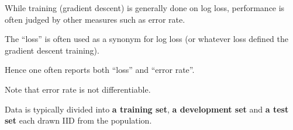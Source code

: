 {

While training (gradient descent) is generally done on log loss, performance is often judged by other measures such as error rate.

\vfill
The ``loss'' is often used as a synonym for log loss (or whatever loss defined the gradient descent training).

\vfill
Hence one often reports both ``loss'' and ``error rate''.

\vfill
Note that error rate is not differentiable.


Data is typically divided into {\bf a training set}, {\bf a development set} and {\bf a test set} each drawn IID from the population.

}
